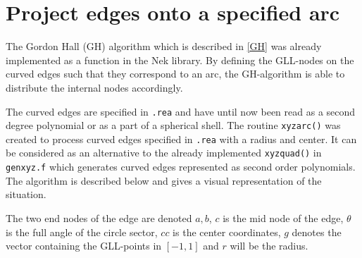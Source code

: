 \section{Project edges onto a specified arc} \label{xyzarc}

The Gordon Hall (GH) algorithm which is described in \cref{GH} was already implemented as a function in the Nek library.
By defining the GLL-nodes on the curved edges such that they correspond to an arc, the GH-algorithm is able to distribute 
the internal nodes accordingly. 

The curved edges are specified in \verb|.rea| and have until now been read as a second degree polynomial or as a part of a 
spherical shell. The routine \verb|xyzarc()| was created to process curved edges specified in \verb|.rea| with a radius and center.
It can be considered as an alternative to the already implemented \verb|xyzquad()| in \verb|genxyz.f| which generates curved edges 
represented as second order polynomials.
The algorithm is described below and  gives a visual representation of the situation.

The two end nodes of the edge are denoted $a,b$, 
$c$ is the mid node of the edge, 
$\theta$ is the full angle of the circle sector,
$cc$ is the center coordinates, 
$g$ denotes the vector containing the GLL-points in $[-1,1]$ 
and $r$ will be the radius.

